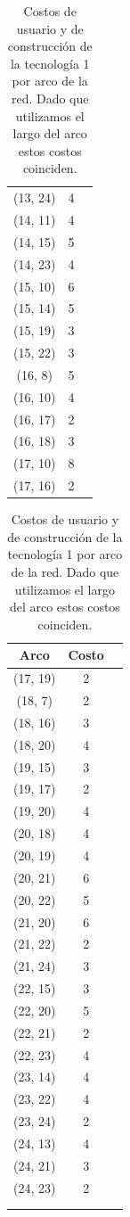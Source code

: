 \begin{table}[h!]
\begin{tabular}{ccc}
    (13, 24) & 4 \\
    (14, 11) & 4 \\
    (14, 15) & 5 \\
    (14, 23) & 4 \\
    (15, 10) & 6 \\
    (15, 14) & 5 \\
    (15, 19) & 3 \\
    (15, 22) & 3 \\
    (16, 8) & 5 \\
    (16, 10) & 4 \\
    (16, 17) & 2 \\
    (16, 18) & 3 \\
    (17, 10) & 8 \\
    (17, 16) & 2 \\
 \bottomrule
\end{tabular}
\begin{tabular}{ccc}
  \toprule
    Arco & Costo \\
  \midrule
    (17, 19) & 2 \\
    (18, 7) & 2 \\
    (18, 16) & 3 \\
    (18, 20) & 4 \\
    (19, 15) & 3 \\
    (19, 17) & 2 \\
    (19, 20) & 4 \\
    (20, 18) & 4 \\
    (20, 19) & 4 \\
    (20, 21) & 6 \\
    (20, 22) & 5 \\
    (21, 20) & 6 \\
    (21, 22) & 2 \\
    (21, 24) & 3 \\
    (22, 15) & 3 \\
    (22, 20) & 5 \\
    (22, 21) & 2 \\
    (22, 23) & 4 \\
    (23, 14) & 4 \\
    (23, 22) & 4 \\
    (23, 24) & 2 \\
    (24, 13) & 4 \\
    (24, 21) & 3 \\
    (24, 23) & 2 \\
     & \\
     & \\
  \bottomrule
\end{tabular}
\caption{Costos de usuario y de construcción de la tecnología 1 por arco de la red. Dado que utilizamos el largo del arco estos costos coinciden.}\label{table:siouxfallsgraphdata}
\end{table}

